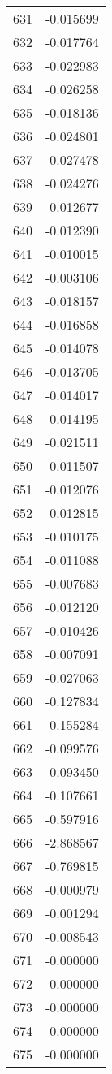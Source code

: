 \documentclass[12pt]{article}
\begin{document}
\begin{longtable}{@{}cc@{}}
631 & -0.015699 \\
632 & -0.017764 \\
633 & -0.022983 \\
634 & -0.026258 \\
635 & -0.018136 \\
636 & -0.024801 \\
637 & -0.027478 \\
638 & -0.024276 \\
639 & -0.012677 \\
640 & -0.012390 \\
641 & -0.010015 \\
642 & -0.003106 \\
643 & -0.018157 \\
644 & -0.016858 \\
645 & -0.014078 \\
646 & -0.013705 \\
647 & -0.014017 \\
648 & -0.014195 \\
649 & -0.021511 \\
650 & -0.011507 \\
651 & -0.012076 \\
652 & -0.012815 \\
653 & -0.010175 \\
654 & -0.011088 \\
655 & -0.007683 \\
656 & -0.012120 \\
657 & -0.010426 \\
658 & -0.007091 \\
659 & -0.027063 \\
660 & -0.127834 \\
661 & -0.155284 \\
662 & -0.099576 \\
663 & -0.093450 \\
664 & -0.107661 \\
665 & -0.597916 \\
666 & -2.868567 \\
667 & -0.769815 \\
668 & -0.000979 \\
669 & -0.001294 \\
670 & -0.008543 \\
671 & -0.000000 \\
672 & -0.000000 \\
673 & -0.000000 \\
674 & -0.000000 \\
675 & -0.000000 \\

\end{longtable}
\end{document}
